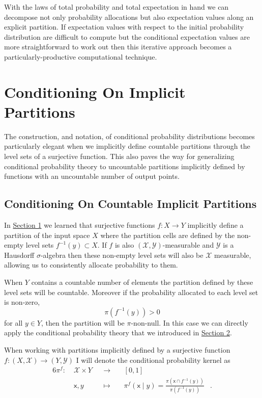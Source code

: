 \documentclass[
  letterpaper,
  DIV=11,
  numbers=noendperiod]{scrartcl}
\begin{document}
With the laws of total probability and total expectation in hand we can
decompose not only probability allocations but also expectation values
along an explicit partition. If expectation values with respect to the
initial probability distribution are difficult to compute but the
conditional expectation values are more straightforward to work out then
this iterative approach becomes a particularly-productive computational
technique.

\section{Conditioning On Implicit
Partitions}\label{conditioning-on-implicit-partitions}

The construction, and notation, of conditional probability distributions
becomes particularly elegant when we implicitly define countable
partitions through the level sets of a surjective function. This also
paves the way for generalizing conditional probability theory to
uncountable partitions implicitly defined by functions with an
uncountable number of output points.

\subsection{Conditioning On Countable Implicit
Partitions}\label{conditioning-on-countable-implicit-partitions}

In \hyperref[sec:partitions]{Section 1} we learned that surjective
functions \(f : X \rightarrow Y\) implicitly define a partition of the
input space \(X\) where the partition cells are defined by the non-empty
level sets \(f^{-1}(y) \subset X\). If \(f\) is also
\((\mathcal{X}, \mathcal{Y})\)-measurable and \(\mathcal{Y}\) is a
Hausdorff \(\sigma\)-algebra then these non-empty level sets will also
be \(\mathcal{X}\) measurable, allowing us to consistently allocate
probability to them.

When \(Y\) contains a countable number of elements the partition defined
by these level sets will be countable. Moreover if the probability
allocated to each level set is non-zero, \[
\pi( f^{-1}(y) ) > 0
\] for all \(y \in Y\), then the partition will be \(\pi\)-non-null. In
this case we can directly apply the conditional probability theory that
we introduced in \hyperref[sec:explicit-conditional]{Section 2}.

When working with partitions implicitly defined by a surjective function
\(f : (X, \mathcal{X}) \rightarrow (Y, \mathcal{Y})\) I will denote the
conditional probability kernel as \begin{alignat*}{6}
\pi^{f} :\; &\mathcal{X} \times Y& &\rightarrow& \; &[0, 1]&
\\
&\mathsf{x}, y& &\mapsto&
&\pi^{f} ( \mathsf{x} \mid y ) =
 \frac{ \pi(\mathsf{x} \cap f^{-1}(y)) }{ \pi(f^{-1}(y)) } &.
\end{alignat*}
\end{document}
